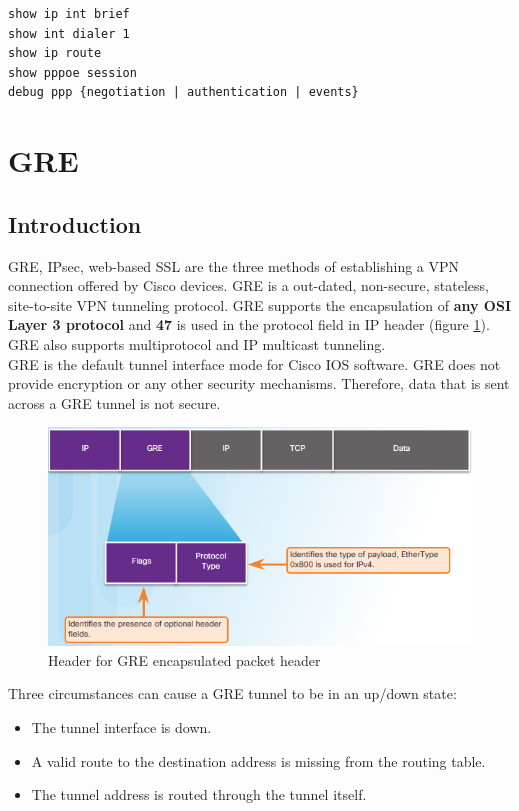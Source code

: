 \begin{verbatim}
show ip int brief
show int dialer 1
show ip route
show pppoe session
debug ppp {negotiation | authentication | events}
\end{verbatim}

\section{GRE}

\subsection{Introduction}

GRE, IPsec, web-based SSL are the three methods of establishing a VPN connection offered by Cisco devices. GRE is a out-dated, non-secure, stateless, site-to-site VPN tunneling protocol. GRE supports the encapsulation of \textbf{any OSI Layer 3 protocol} and \textbf{47} is used in the protocol field in IP header (figure \ref{GREpacket}). GRE also supports multiprotocol and IP multicast tunneling.\\

GRE is the default tunnel interface mode for Cisco IOS software. GRE does not provide encryption or any other security mechanisms. Therefore, data that is sent across a GRE tunnel is not secure.\\

\begin{figure}[hbtp]
\caption{Header for GRE encapsulated packet header}\label{GREpacket}
\centering
\includegraphics[scale=1]{pictures/GREpacket.PNG}
\end{figure}

Three circumstances can cause a GRE tunnel to be in an up/down state:
\begin{itemize}
\item The tunnel interface is down.
\item A valid route to the destination address is missing from the routing table.
\item The tunnel address is routed through the tunnel itself.
\end{itemize}

